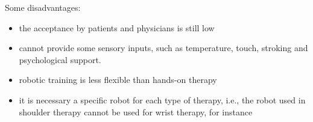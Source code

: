 \documentclass[12pt,article,oneside,a4paper]{memoir}
\begin{document}
\begin{enumerate}
Some disadvantages:
\begin{itemize}
\item the acceptance by patients and physicians is still low
\item cannot provide some sensory inputs, such as temperature, touch, stroking
and psychological support.
\item robotic training is less flexible than hands-on therapy
\item it is necessary a specific robot for each type of therapy, i.e., the
robot used in shoulder therapy cannot be used for wrist therapy, for instance
\end{itemize}

\end{enumerate}

\end{document}
